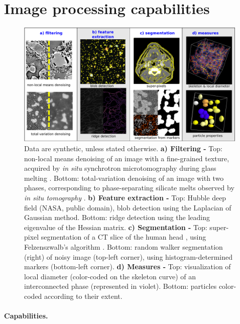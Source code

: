 \documentclass[twocolumn]{bmcart}%
\begin{document}
\section*{Image processing capabilities}

\begin{figure}
    \centerline{\includegraphics[width=0.99\textwidth]{tomo_gallery}}
    \caption{
	Data are synthetic, unless stated otherwise.
	\textbf{a) Filtering -} Top: non-local means denoising of an image
	with a fine-grained texture, acquired by \emph{in situ}
	synchrotron microtomography during
	glass melting \citep{Gouillart2012}. Bottom: total-variation
	denoising of an image with two phases, corresponding to
	phase-separating silicate melts observed by \emph{in situ
	tomography} \citep{Bouttes2015}.
	\textbf{b) Feature extraction -} Top: Hubble deep field (NASA,
	public domain), blob detection using the
	Laplacian of Gaussian method. Bottom: ridge detection using the
	leading eigenvalue of the Hessian matrix.
	\textbf{c) Segmentation - } Top: super-pixel segmentation
	of a CT slice of the human head \citep{tomo_wikipedia}, using
	Felzenszwalb's algorithm \citep{Felzenszwalb2004}. Bottom: random
	walker segmentation (right) of noisy image (top-left corner), using
	histogram-determined markers (bottom-left corner).
	\textbf{d) Measures -} Top: visualization of local diameter
	(color-coded on the skeleton curve) of an
	interconnected phase (represented in violet).  Bottom: particles color-coded according
	to their extent.
\label{fig:tomo_gallery}}
\end{figure}

\paragraph{Capabilities.}
\end{document}
